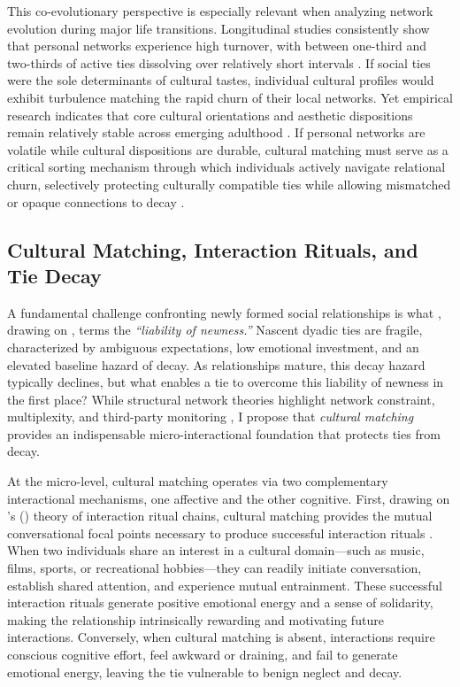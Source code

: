 \documentclass[12pt,letterpaper]{article}
\begin{document}
This co-evolutionary perspective is especially relevant when analyzing network evolution during major life transitions. Longitudinal studies consistently show that personal networks experience high turnover, with between one-third and two-thirds of active ties dissolving over relatively short intervals \citep{morgan1997, suitor1997, roy2022turnover, weiss2022life}. If social ties were the sole determinants of cultural tastes, individual cultural profiles would exhibit turbulence matching the rapid churn of their local networks. Yet empirical research indicates that core cultural orientations and aesthetic dispositions remain relatively stable across emerging adulthood \citep{vaisey2010, childress2019encultured-e58}. If personal networks are volatile while cultural dispositions are durable, cultural matching must serve as a critical sorting mechanism through which individuals actively navigate relational churn, selectively protecting culturally compatible ties while allowing mismatched or opaque connections to decay \citep{dimaggio1987, lizardo2006}.

\subsection{Cultural Matching, Interaction Rituals, and Tie Decay}\label{cultural-matching-and-tie-decay}

A fundamental challenge confronting newly formed social relationships is what \citet{burt2000}, drawing on \citet{stinchcombe1965}, terms the \textit{``liability of newness.''} Nascent dyadic ties are fragile, characterized by ambiguous expectations, low emotional investment, and an elevated baseline hazard of decay. As relationships mature, this decay hazard typically declines, but what enables a tie to overcome this liability of newness in the first place? While structural network theories highlight network constraint, multiplexity, and third-party monitoring \citep{coleman1988, burt2000}, I propose that \textit{cultural matching} provides an indispensable micro-interactional foundation that protects ties from decay.

At the micro-level, cultural matching operates via two complementary interactional mechanisms, one affective and the other cognitive. First, drawing on \citeauthor{collins2004}'s (\citeyear{collins2004}) theory of interaction ritual chains, cultural matching provides the mutual conversational focal points necessary to produce successful interaction rituals \citep{meuleman2021cultural-094}. When two individuals share an interest in a cultural domain---such as music, films, sports, or recreational hobbies---they can readily initiate conversation, establish shared attention, and experience mutual entrainment. These successful interaction rituals generate positive emotional energy and a sense of solidarity, making the relationship intrinsically rewarding and motivating future interactions. Conversely, when cultural matching is absent, interactions require conscious cognitive effort, feel awkward or draining, and fail to generate emotional energy, leaving the tie vulnerable to benign neglect and decay.
\end{document}
